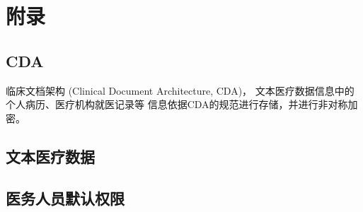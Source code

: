 \documentclass[UTF8]{ctexart}
\begin{document}
    \newpage

    \section{附录}
    \subsection{CDA}
    \par
    临床文档架构
    (Clinical Document Architecture, CDA)，
    文本医疗数据信息中的个人病历、医疗机构就医记录等
    信息依据CDA的规范进行存储，并进行非对称加密。
    \subsection{文本医疗数据}
    \par
    \subsection{医务人员默认权限}
    \par
\end{document}
